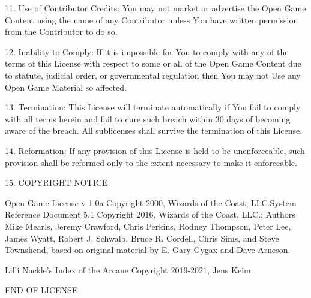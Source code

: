 \documentclass[letter,10pt,twocolumn,openany]{dndbook}
\begin{document}
11. Use of Contributor Credits: You may not market or advertise the Open Game Content using the name of any Contributor unless You have written permission from the Contributor to do so.

12. Inability to Comply: If it is impossible for You to comply with any of the terms of this License with respect to some or all of the Open Game Content due to statute, judicial order, or governmental regulation then You may not Use any Open Game Material so affected.

13. Termination: This License will terminate automatically if You fail to comply with all terms herein and fail to cure such breach within 30 days of becoming aware of the breach. All sublicenses shall survive the termination of this License.

14. Reformation: If any provision of this License is held to be unenforceable, such provision shall be reformed only to the extent necessary to make it enforceable.

15. COPYRIGHT NOTICE

    Open Game License v 1.0a Copyright 2000, Wizards of the Coast, LLC.System Reference Document 5.1 Copyright 2016, Wizards of the Coast, LLC.; Authors Mike Mearls, Jeremy Crawford, Chris Perkins, Rodney Thompson, Peter Lee, James Wyatt, Robert J. Schwalb, Bruce R. Cordell, Chris Sims, and Steve Townshend, based on original material by E. Gary Gygax and Dave Arneson.

    Lilli Nackle’s Index of the Arcane Copyright 2019-2021, Jens Keim

END OF LICENSE
\end{document}
